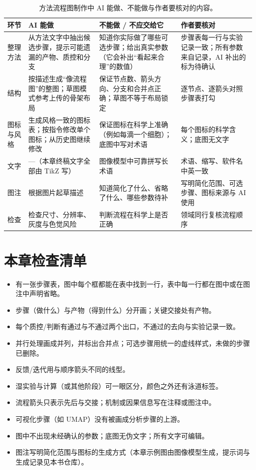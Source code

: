 \begin{table}[htbp]\centering\footnotesize
\setlength{\tabcolsep}{3pt}
\renewcommand{\arraystretch}{1.15}
\caption{方法流程图制作中 AI 能做、不能做与作者要核对的内容。}\label{tab:ch06-03}
\begin{tabularx}{\linewidth}{@{}>{\raggedright\arraybackslash}p{18mm}YYY@{}}
\toprule
\textbf{环节} & \textbf{AI 能做} & \textbf{不能做 / 不应交给它} & \textbf{作者要核对} \\
\midrule
整理方法 & 从方法文字中抽出候选步骤，提示可能遗漏的产物、质控和分支 & 知道你实际做了哪些可选步骤；给出真实参数（它会补出“看起来合理”的数值） & 步骤表每一行与实验记录一致；所有参数来自记录，AI 补出的标为待确认 \\
结构 & 按描述生成“像流程图”的整图；草图模式参考上传的骨架布局 & 保证节点数、箭头方向、分支和合并点正确；草图不等于布局锁定 & 逐节点、逐箭头对照步骤表打勾 \\
图标与风格 & 生成风格一致的图标表；按指令修改单个图标；从历史图继续修改 & 保证图标在科学上准确（例如每滴一个细胞）；底图中写对术语 & 每个图标的科学含义；底图无文字 \\
文字 & —（本章终稿文字全部由 TikZ 写） & 图像模型中可靠拼写长术语 & 术语、缩写、软件名中英一致 \\
图注 &  根据图片起草描述 & 知道简化了什么、省略了什么、哪些参数待补 & 写明简化范围、可选步骤、图标来源与 AI 使用 \\
检查 &  检查尺寸、分辨率、灰度与色觉风险 & 判断流程在科学上是否正确 & 领域同行复核流程顺序 \\
\bottomrule
\end{tabularx}
\end{table}

\section{本章检查清单}

\begin{itemize}
\item 有一张步骤表，图中每个框都能在表中找到一行，表中每一行都在图中或在图注中声明省略。
\item 步骤（做什么）与产物（得到什么）分开画；关键交接处有产物。
\item 每个质控/判断有通过与不通过两个出口，不通过的去向与实验记录一致。
\item 并行处理画成并列，并标出合并点；可选步骤用统一的虚线样式，未做的步骤已删除。
\item 反馈/迭代用与顺序箭头不同的线型。
\item 湿实验与计算（或其他阶段）可一眼区分，颜色之外还有泳道标签。
\item 流程箭头只表示先后与交接；机制或因果信息写在注释或图注中。
\item 可视化步骤（如 UMAP）没有被画成分析步骤的上游。
\item 图中不出现未经确认的参数；底图无伪文字；所有文字可编辑。
\item 图注写明简化范围与图标的生成方式（本章示例图由图像模型生成，提示词与生成记录见本书仓库）。
\end{itemize}

